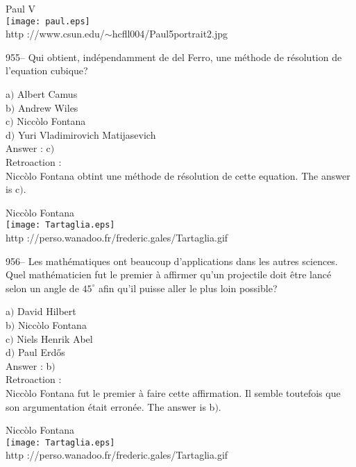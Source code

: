 ﻿\documentclass[letterpaper, 12pt]{article}
\begin{document}
        \begin{center}
        Paul V\\
    \texttt{[image: paul.eps]}\\
        {\footnotesize http
://www.csun.edu/$\sim$hcfll004/Paul5portrait2.jpg}
    \end{center}

955-- Qui obtient, ind\'ependamment de del Ferro, une m\'ethode de
r\'esolution de l'equation cubique?

a$)$ Albert Camus \\
b$)$ Andrew Wiles \\
c$)$ Nicc\`olo Fontana  \\
d$)$ Yuri Vladimirovich Matijasevich \\

Answer : c$)$\\

Retroaction : \\
Nicc\`olo Fontana obtint une m\'ethode de r\'esolution de cette equation.
The answer is c$)$.\\

        \begin{center}
        Nicc\`olo Fontana\\
    \texttt{[image: Tartaglia.eps]}\\
        {\footnotesize http
://perso.wanadoo.fr/frederic.gales/Tartaglia.gif}
    \end{center}

956-- Les math\'ematiques ont beaucoup d'applications dans les
autres sciences. Quel math\'ematicien fut le premier \`a affirmer
qu'un projectile doit \^etre lanc\'e selon un angle de $45^{\circ}$
afin qu'il puisse aller le plus loin possible?

a$)$ David Hilbert \\
b$)$ Nicc\`olo Fontana  \\
c$)$ Niels Henrik Abel  \\
d$)$ Paul Erd\H{o}s\\

Answer : b$)$\\

Retroaction : \\
Nicc\`olo Fontana fut le premier \`a faire cette affirmation. Il
semble toutefois que son
argumentation \'etait erron\'ee. The answer is b$)$.\\

        \begin{center}
        Nicc\`olo Fontana\\
    \texttt{[image: Tartaglia.eps]}\\
        {\footnotesize http
://perso.wanadoo.fr/frederic.gales/Tartaglia.gif}
    \end{center}
\end{document}

